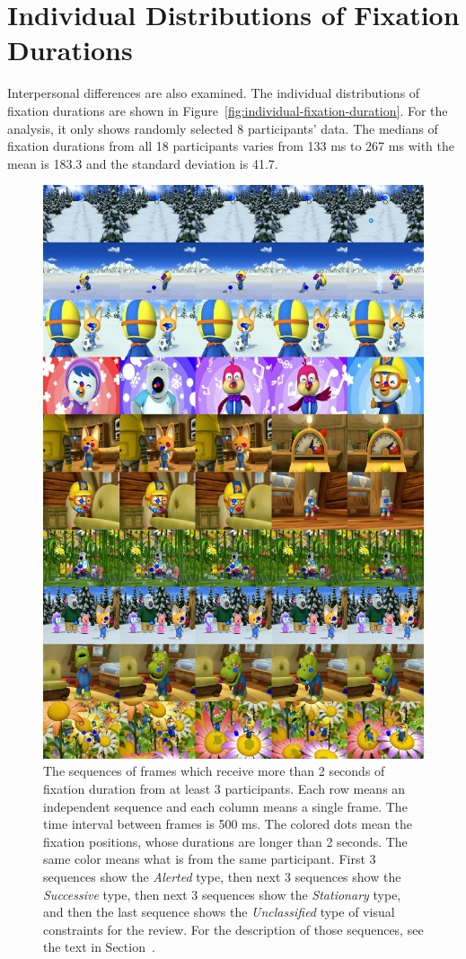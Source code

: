 \documentclass[oneside,master]{snueethesis}
\begin{document}
\section{Individual Distributions of Fixation Durations}

Interpersonal differences are also examined. The individual distributions of fixation durations are shown in Figure~\ref{fig:individual-fixation-duration}. For the analysis, it only shows randomly selected 8 participants' data. The medians of fixation durations from all 18 participants varies from 133 ms to 267 ms with the mean is 183.3 and the standard deviation is 41.7.


\begin{figure}
  \centerline{\includegraphics[width=120mm]{./eps/long_fixations_types.png}}
  \caption[The samples of sequence types]{The sequences of frames which receive more than 2 seconds of fixation duration from at least 3 participants. Each row means an independent sequence and each column means a single frame. The time interval between frames is 500 ms. The colored dots mean the fixation positions, whose durations are longer than 2 seconds. The same color means what is from the same participant. First 3 sequences show the \textit{Alerted} type, then next 3 sequences show the \textit{Successive} type, then next 3 sequences show the \textit{Stationary} type, and then the last sequence shows the \textit{Unclassified} type of visual constraints for the review. For the description of those sequences, see the text in Section~\textit{}.}
  \label{fig:long-fixations}
\end{figure}
\end{document}
